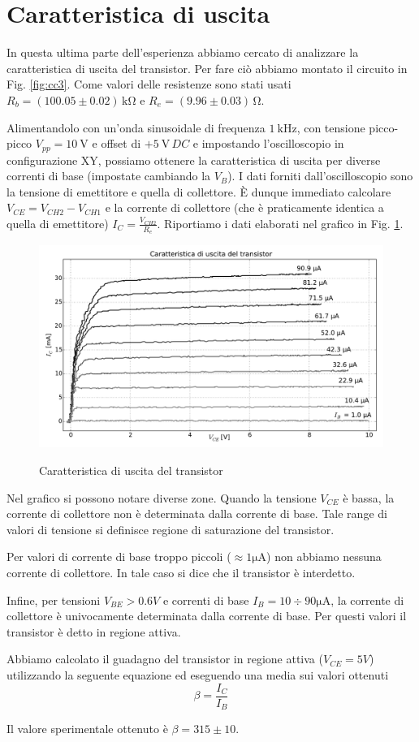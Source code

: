 \section{Caratteristica di uscita}

In questa ultima parte dell'esperienza abbiamo cercato di analizzare la caratteristica di uscita del transistor.
Per fare ciò abbiamo montato il circuito in Fig. \ref{fig:cc3}. Come valori delle resistenze sono stati usati $R_b=(100.05\pm0.02)\,\si{\kilo\ohm}$ e $R_e=(9.96\pm 0.03)\,\si{\ohm}$.

Alimentandolo con un'onda sinusoidale di frequenza $\SI{1}{\kilo\hertz}$, con tensione picco-picco $V_{pp} = \SI{10}{\volt}$ e offset di $+\SI{5}{\volt} \, DC$ e impostando l'oscilloscopio in configurazione XY, possiamo ottenere la caratteristica di uscita per diverse correnti di base (impostate cambiando la $V_B$).
I dati forniti dall'oscilloscopio sono la tensione di emettitore e quella di collettore. È dunque immediato calcolare $V_{CE}=V_{CH2}-V_{CH1}$ e la corrente di collettore (che è praticamente identica a quella di emettitore) $I_C=\frac{V_{CH2}}{R_e}$. Riportiamo i dati elaborati nel grafico in Fig. \ref{fig:xy}.

\begin{figure}[h]
\centering
	\caption{Caratteristica di uscita del transistor}
	\includegraphics[scale=0.45]{xy.pdf}
	\label{fig:xy}
\end{figure}

Nel grafico si possono notare diverse zone.
Quando la tensione $V_{CE}$ è bassa, la corrente di collettore non è determinata dalla corrente di base.
Tale range di valori di tensione si definisce regione di saturazione del transistor. 

Per valori di corrente di base troppo piccoli ($\approx 1 \si{\micro\ampere}$) non abbiamo nessuna corrente di collettore. In tale caso si dice che il transistor è interdetto.

Infine, per tensioni $V_{BE}>0.6V$ e correnti di base $I_B=10 \div 90 \si{\micro	\ampere}$, la corrente di collettore è univocamente determinata dalla corrente di base. Per questi valori il transistor è detto in regione attiva.

Abbiamo calcolato il guadagno del transistor in regione attiva ($V_{CE}=5V$) utilizzando la seguente equazione ed eseguendo una media sui valori ottenuti
$$\beta=\frac{I_C}{I_B}$$

Il valore sperimentale ottenuto è $\beta=315 \pm 10$.